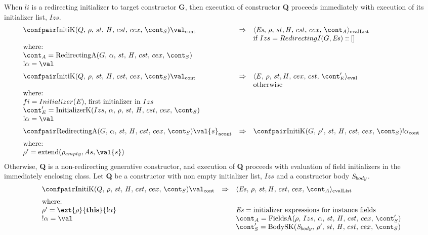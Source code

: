 \documentclass{article}
\DeclareMathOperator{\extend}{extend}
\begin{document}
\noindent
When $li$ is a redirecting initializer to target constructor \textbf{G}, then execution of constructor \textbf{Q} proceeds immediately with execution of its initializer list, $Izs$.
\[
  \begin{array}{lcl}
	\contconf{\InitK{Q}{\env}{\scont}}{\val}
	& \Rightarrow &
	\evallistconf{\exprs}{\env}{\strace}{\cstrace}{\cex}{\acont}\\
	&&
	\textrm{if } Izs = RedirectingI(G, \exprs) :: []\\
	\textrm{where:}\\
	\acont = \RedirectingA{G}{\loc}{\scont}\\
	\deref{\loc} = \val
	\\[2mm]

	\contconf{\InitK{Q}{\env}{\scont}}{\val}
	& \Rightarrow &
	\evalconf{\expr}{\env}{st}{cex}{cst}{\econt'}\\
	&&
	\textrm{otherwise}\\
	\textrm{where:}\\

	fi = Initializer(\expr) \textrm{, first initializer in }Izs\\
	\econt' = \InitializerK{Izs}{\loc}{\env}{\scont}\\
	\deref{\loc} = \val\\[2mm]

	\acontconf{\RedirectingA{G}{\loc}{\scont}}{\val{s}}
	& \Rightarrow &
	\contconf{\InitK{G}{\env'}{\scont}}{\deref{\loc}}\\[2mm]
	\textrm{where:}\\
	\env' = \extend(\env_{empty}, \formals, \val{s})
  \end{array}
\]
\noindent
Otherwise, \textbf{Q} is a non-redirecting generative constructor, and execution of \textbf{Q} proceeds with evaluation of field initializers in the immediately enclosing class.
\noindent
Let \textbf{Q} be a constructor with non empty initializer list, $Izs$ and a constructor body $\mathit{S}_{body}$.
\[
  \begin{array}{lcl}
	\contconf{\InitK{Q}{\env}{\scont}}{\val}
	& \Rightarrow &
	\evallistconf{\exprs}{\env}{\strace}{\cstrace}{\cex}{\acont}\\[2mm]

	\textrm{where:}\\
	\env' = \ext{\env}{\mathbf{this}}{\deref{\loc}}
	&&
	\exprs = \textrm{initializer expressions for instance fields}\\
	\deref{\loc} = \val
	&&
	\acont = \FieldsA{\env}{Izs}{\loc}{\scont'}\\
	&&
	\scont' = \BodySK{\stmt_{body}}{\env'}{\scont}
  \end{array}
\]
\end{document}
